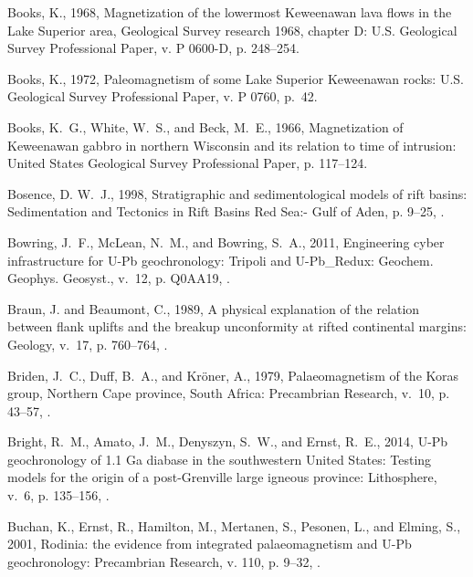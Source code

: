 \documentclass[11pt,letterpaper]{article}
\begin{document}
\begin{thebibliography}{153}
Books, K., 1968, Magnetization of the lowermost {K}eweenawan lava flows in the
  {L}ake {S}uperior area, {G}eological {S}urvey research 1968, chapter {D}:
  U.S. Geological Survey Professional Paper, v. P 0600-D, p. 248--254.

Books, K., 1972, Paleomagnetism of some {L}ake {S}uperior {K}eweenawan rocks:
  U.S. Geological Survey Professional Paper, v. P 0760, p.~42.

Books, K.~G., White, W.~S., and Beck, M.~E., 1966, Magnetization of
  {K}eweenawan gabbro in northern {W}isconsin and its relation to time of
  intrusion: United States Geological Survey Professional Paper, p. 117--124.

Bosence, D. W.~J., 1998, Stratigraphic and sedimentological models of rift
  basins: Sedimentation and Tectonics in Rift Basins Red Sea:- Gulf of Aden, p.
  9--25, .

Bowring, J.~F., McLean, N.~M., and Bowring, S.~A., 2011, {Engineering cyber
  infrastructure for U-Pb geochronology: Tripoli and U-Pb{\_}Redux}: Geochem.
  Geophys. Geosyst., v.~12, p. Q0AA19, .

Braun, J. and Beaumont, C., 1989, A physical explanation of the relation
  between flank uplifts and the breakup unconformity at rifted continental
  margins: Geology, v.~17, p. 760--764,
  .

Briden, J.~C., Duff, B.~A., and Kr{\"o}ner, A., 1979, Palaeomagnetism of the
  Koras group, Northern Cape province, South Africa: Precambrian Research,
  v.~10, p. 43--57, .

Bright, R.~M., Amato, J.~M., Denyszyn, S.~W., and Ernst, R.~E., 2014, {U-Pb
  geochronology of 1.1 Ga diabase in the southwestern United States: Testing
  models for the origin of a post-Grenville large igneous province}:
  Lithosphere, v.~6, p. 135--156, .

Buchan, K., Ernst, R., Hamilton, M., Mertanen, S., Pesonen, L., and Elming, S.,
  2001, Rodinia: the evidence from integrated palaeomagnetism and {U-Pb}
  geochronology: Precambrian Research, v. 110, p. 9--32,
  .


\end{thebibliography}
\end{document}
